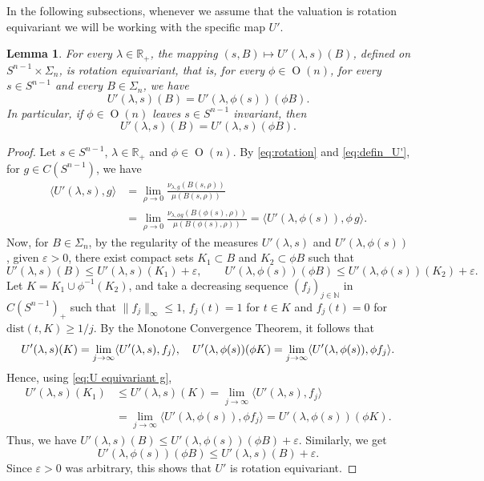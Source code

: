 \documentclass[11pt, a4paper]{amsart}
\newtheorem{lemma}[proposition]{Lemma}
\newcommand{\dist}{\mbox{dist}}
\newcommand{\sn}{{S^{n-1}}}
\newcommand{\on}{\operatorname{O}(n)}
\newcommand{\cfn}{C(\sn )_{\scriptscriptstyle +}}
\begin{document}
In the following subsections, whenever we assume that the valuation is rotation equivariant we will be working with the specific map $U'$.



\begin{lemma}\label{l: equivariant measures}
For every $\lambda \in \mathbb{R}_{\scriptscriptstyle +}$, the mapping $(s,B)\mapsto U'(\lambda,s)(B)$, defined on $\sn\times \Sigma_n$, is rotation equivariant, that is, for every $\phi\in\on$, for every $s\in\sn$ and every $B\in\Sigma_n$, we have
\[
    U'(\lambda,s)(B)=U'(\lambda,\phi (s))(\phi B).
\]
In particular, if $\phi\in\on$ leaves $s\in S^{n-1}$ invariant, then 
\[
    U'(\lambda,s)(B)=U'(\lambda,s)(\phi B).
\]
\end{lemma}

\begin{proof}
Let $s\in \sn $, $\lambda\in\mathbb{R}_{\scriptscriptstyle +}$ and $\phi \in \on$. By \eqref{eq:rotation} and \eqref{eq:defin_U'}, for $g\in C(\sn )$, we have 
\begin{equation}\label{eq:U equivariant g}
\begin{split}
    \langle U'(\lambda,s),g\rangle &= \lim_{\rho\rightarrow 0} \frac{ \nu_{\lambda,g}( B(s, \rho))}{\mu(B(s,\rho))} \\
    &= \lim_{\rho\rightarrow 0} \frac{\nu_{\lambda,\phi g}( B(\phi(s), \rho))}{\mu(B(\phi(s),\rho))} =  \langle U'(\lambda,\phi(s)),\phi\, g\rangle.
\end{split}
\end{equation}
Now, for $B\in \Sigma_n$, by the regularity of the measures $U'(\lambda,s)$ and $U'(\lambda,\phi(s))$, given $\varepsilon>0$, there exist compact sets $K_1\subset B$ and $K_2\subset \phi B$ such that 
$$
U'(\lambda,s)(B)\le U'(\lambda,s)(K_1)+\varepsilon,\quad \quad U'(\lambda,\phi(s))(\phi B)\le U'(\lambda,\phi(s))(K_2)+\varepsilon.
$$
Let $K=K_1\cup\phi^{-1}(K_2)$, and take a decreasing sequence $(f_j)_{j\in\mathbb N}$ in $\cfn$  such that $\|f_j\|_{\scriptscriptstyle \infty}\leq1$, $f_j(t)=1$ for $t\in K$ and $f_j(t)=0$ for $\dist(t,K)\geq 1/j$. By the Monotone Convergence Theorem, it follows that
$$
U'(\lambda,s)(K)=\lim_{j\to\infty}\langle U'(\lambda, s),f_j\rangle,\hspace{3.5mm} U'(\lambda,\phi(s))(\phi K)=\lim_{j\to\infty}\langle U'(\lambda,\phi (s)),\phi f_j\rangle.
$$
Hence, using \eqref{eq:U equivariant g}, 
\begin{align*}
U'(\lambda,s)(K_1) &\leq U'(\lambda,s)(K)=\lim_{j\to\infty}\langle U'(\lambda,s),f_j\rangle\\
&=\lim_{j\to\infty}\langle U'(\lambda,\phi (s)),\phi f_j\rangle=U'(\lambda,\phi(s))(\phi K).
\end{align*}
Thus, we have $U'(\lambda,s)(B)\le U'(\lambda,\phi(s))(\phi B) +\varepsilon$.
Similarly, we get $$U'(\lambda,\phi(s))(\phi B)\le U'(\lambda,s)(B)+\varepsilon.$$
Since $\varepsilon>0$ was arbitrary, this shows that $U'$ is rotation equivariant.
\end{proof}
\end{document}
